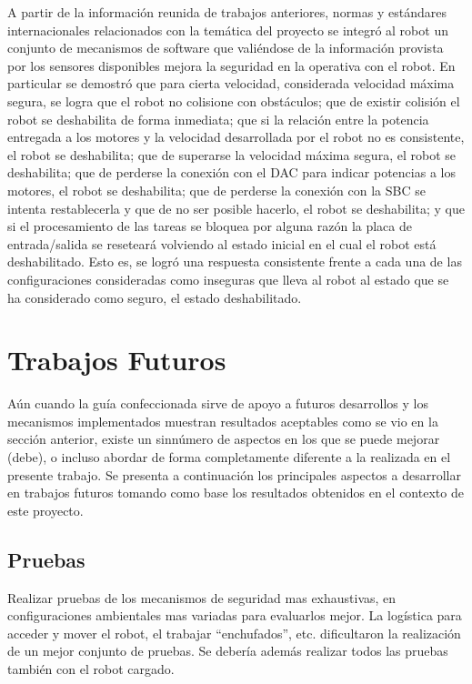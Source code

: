 \documentclass[withindex,glossary]{cam-thesis}
\begin{document}
A partir de la información reunida de trabajos anteriores, normas y estándares internacionales relacionados con la temática del proyecto se integró al robot un conjunto de mecanismos de software que valiéndose de la información provista por los sensores disponibles mejora la seguridad en la operativa con el robot. En particular se demostró que para cierta velocidad, considerada velocidad máxima segura, se logra que el robot no colisione con obstáculos; que de existir colisión el robot se deshabilita de forma inmediata; que si la relación entre la potencia entregada a los motores y la velocidad desarrollada por el robot no es consistente, el robot se deshabilita; que de superarse la velocidad máxima segura, el robot se deshabilita; que de perderse la conexión con el DAC para indicar potencias a los motores, el robot se deshabilita; que de perderse la conexión con la SBC se intenta restablecerla y que de no ser posible hacerlo, el robot se deshabilita; y que si el procesamiento de las tareas se bloquea por alguna razón la placa de entrada/salida se reseteará volviendo al estado inicial en el cual el robot está deshabilitado. Esto es, se logró una respuesta consistente frente a cada una de las configuraciones consideradas como inseguras que lleva al robot al estado que se ha considerado como seguro, el estado deshabilitado.

\section{Trabajos Futuros}
Aún cuando la guía confeccionada sirve de apoyo a futuros desarrollos y los mecanismos implementados muestran resultados aceptables como se vio en la sección anterior, existe un sinnúmero de aspectos en los que se puede mejorar (debe), o incluso abordar de forma completamente diferente a la realizada en el presente trabajo.
Se presenta a continuación los principales aspectos a desarrollar en trabajos futuros tomando como base los resultados obtenidos en el contexto de este proyecto.

\subsection{Pruebas}
Realizar pruebas de los mecanismos de seguridad mas exhaustivas, en configuraciones ambientales mas variadas para evaluarlos mejor. La logística para acceder y mover el robot, el trabajar ``enchufados'', etc. dificultaron la realización de un mejor conjunto de pruebas. Se debería además realizar todos las pruebas también con el robot cargado.
\end{document}
